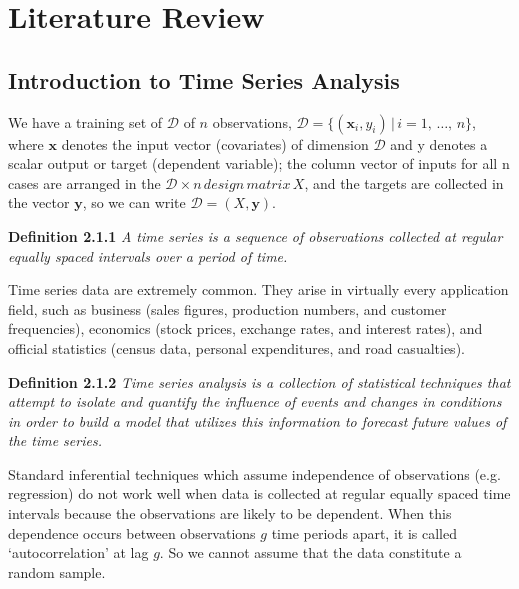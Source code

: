\section{Literature Review}

   \subsection{Introduction to Time Series Analysis}

      \cite{Rasmussen2006} We have a training set of \(\mathcal{D}\) of \(n\) observations, \(\mathcal{D} = \{(\mathbf{x}_{i}, y_{i}) \, | \, i = 1, \, \ldots, \, n\}\), where \(\mathbf{x}\) denotes the input vector (covariates) of dimension \(\mathcal{D}\) and y denotes a scalar output or target (dependent variable); the column vector of inputs for all n cases are arranged in the \(\mathcal{D} \times n \, design \, matrix\, X\), and the targets are collected in the vector \(\mathbf{y}\), so we can write \(\mathcal{D} = (X, \mathbf{y})\). 

      \vspace{1em}

      \textbf{Definition 2.1.1} \cite{Watson2025} \textit{A time series is a sequence of observations collected at regular equally spaced intervals over a period of time.}

      \vspace{1em}

      Time series data are extremely common. They arise in virtually every application field, such as business (sales figures, production numbers, and customer frequencies), economics (stock prices, exchange rates, and interest rates), and official statistics (census data, personal expenditures, and road casualties).

      \vspace{1em}

      \textbf{Definition 2.1.2} \cite{Watson2025} \textit{Time series analysis is a collection of statistical techniques that attempt to isolate and quantify the influence of events and changes in conditions in order to build a model that utilizes this information to forecast future values of the time series.}

      \vspace{1em}

      Standard inferential techniques which assume independence of observations (e.g. regression) do not work well when data is collected at regular equally spaced time intervals because the observations are likely to be dependent. When this dependence occurs between observations \(g\) time periods apart, it is called `autocorrelation' at lag \(g\). So we cannot assume that the data constitute a random sample.

